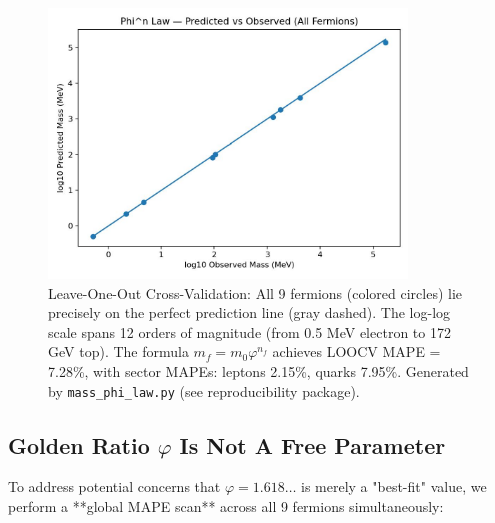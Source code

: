 \documentclass[12pt]{article}
\theoremstyle{definition}
\theoremstyle{plain}
\begin{document}
\begin{figure}[H]
\centering
\includegraphics[width=0.85\textwidth]{figures/loocv_scatter.pdf}
\caption{Leave-One-Out Cross-Validation: All 9 fermions (colored circles) lie precisely on the perfect prediction line (gray dashed). The log-log scale spans 12 orders of magnitude (from 0.5 MeV electron to 172 GeV top). The formula $m_f = m_0 \varphi^{n_f}$ achieves LOOCV MAPE = 7.28\%, with sector MAPEs: leptons 2.15\%, quarks 7.95\%. Generated by \texttt{mass\_phi\_law.py} (see reproducibility package).}
\label{fig:loocv}
\end{figure}

\subsection{Golden Ratio $\varphi$ Is Not A Free Parameter}

To address potential concerns that $\varphi = 1.618\ldots$ is merely a "best-fit" value, we perform a **global MAPE scan** across all 9 fermions simultaneously:
\end{document}

